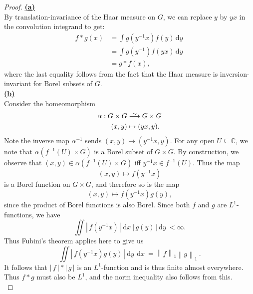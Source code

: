 \documentclass[11pt, x11names, openany]{book}
\newcommand{\cc}{\mathbb{C}}
\newcommand{\bij}{\stackrel{\sim}{\smash{\longrightarrow}\rule{0pt}{0.5ex}}}
\newcommand{\abs}[1]{\left| \, #1  \,\right|}
\newcommand{\norm}[1]{\left\lVert #1 \right \rVert}
\newcommand{\inv}[1]{#1^{-1}}
\newcommand{\dx}{\, \mathrm{d}x \ }
\newcommand{\dy}{\, \mathrm{d}y \ }
\begin{document}
\begin{proof}
\textbf{\underline{(a)}}\\
By translation-invariance of the Haar measure on $G$, we can replace $y$ by $yx$ in the convolution integrand to get:
\begin{equation*}
    \begin{split}
        f*g(x) &= \int g(\inv{y}x)f(y)\dy\\
        &= \int g(\inv{y})f(yx) \dy\\
        &= g * f (x),
    \end{split}
\end{equation*}
where the last equality follows from the fact that the Haar measure is inversion-invariant for Borel subsets of $G$.\\

\textbf{\underline{(b)}}\\
Consider the homeomorphism 
\begin{equation*}
    \begin{split}
        \alpha: G \times G &\bij G \times G\\
        (x, y) &\mapsto (yx, y).
    \end{split}
\end{equation*}
Note the inverse map $\inv{\alpha}$ sends $(x, y) \mapsto (\inv{y}x, y)$. For any open $U \subseteq \cc$, we note that $\alpha(\inv{f}(U) \times G)$ is a Borel subset of $G \times G$. By construction, we observe that $(x, y) \in \alpha(\inv{f}(U) \times G)$ iff $\inv{y}x \in \inv{f}(U)$. Thus the map
\begin{equation*}
    (x, y) \mapsto f(\inv{y}x)
\end{equation*}
is a Borel function on $G \times G$, and therefore so is the map
\begin{equation*}
    (x, y) \mapsto f(\inv{y}x)g(y),
\end{equation*}
since the product of Borel functions is also Borel. Since both $f$ and $g$ are $L^1$-functions, we have
\begin{equation*}
    \iint \abs{f(\inv{y}x)}\dx \abs{g(y)} \dy < \infty.
\end{equation*}
Thus Fubini's theorem applies here to give us
\begin{equation*}
    \iint \abs{f(\inv{y}x)g(y)}\dy \dx = \norm{f}_1 \norm{g}_1 \ .
\end{equation*}
It follows that $\abs{f} * \abs{g}$ is an $L^1$-function and is thus finite almost everywhere. Thus $f * g$ must also be $L^1$, and the norm inequality also follows from this.\\


\end{proof}
\end{document}
